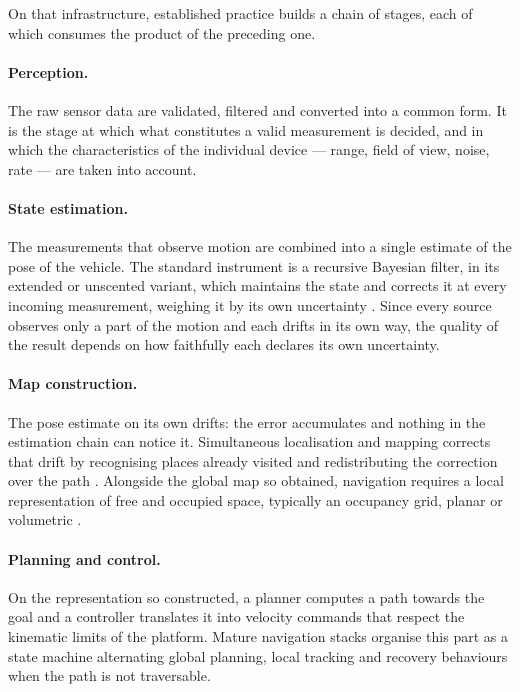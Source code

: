 On that infrastructure, established practice builds a chain of stages, each of
which consumes the product of the preceding one.

\paragraph{Perception.}
The raw sensor data are validated, filtered and converted into a common form. It
is the stage at which what constitutes a valid measurement is decided, and in
which the characteristics of the individual device --- range, field of view,
noise, rate --- are taken into account.

\paragraph{State estimation.}
The measurements that observe motion are combined into a single estimate of the
pose of the vehicle. The standard instrument is a recursive Bayesian filter, in
its extended or unscented variant, which maintains the state and corrects it at
every incoming measurement, weighing it by its own uncertainty
\cite{moore2014localization}. Since every source observes only a part of the
motion and each drifts in its own way, the quality of the result depends on how
faithfully each declares its own uncertainty.

\paragraph{Map construction.}
The pose estimate on its own drifts: the error accumulates and nothing in the
estimation chain can notice it. Simultaneous localisation and mapping corrects
that drift by recognising places already visited and redistributing the
correction over the path \cite{cadena2016slam}. Alongside the global map so
obtained, navigation requires a local representation of free and occupied space,
typically an occupancy grid, planar or volumetric \cite{hornung2013octomap}.

\paragraph{Planning and control.}
On the representation so constructed, a planner computes a path towards the goal
and a controller translates it into velocity commands that respect the kinematic
limits of the platform. Mature navigation stacks \cite{macenski2020nav2}
organise this part as a state machine alternating global planning, local
tracking and recovery behaviours when the path is not traversable.

